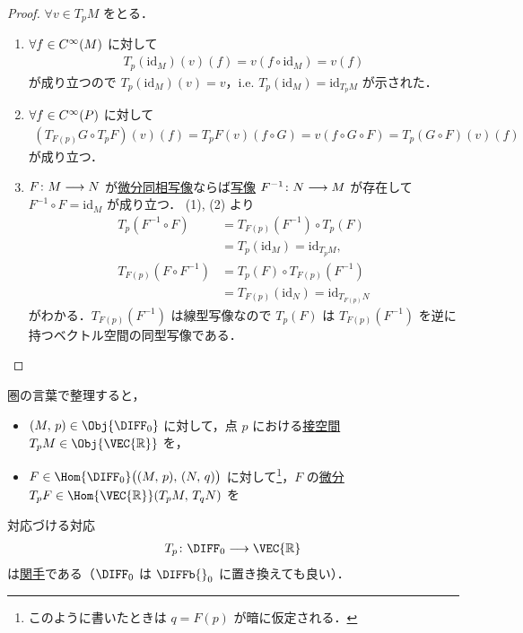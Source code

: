 \documentclass[geometry_main]{subfiles}
\begin{document}
\begin{proof}
	$\forall v \in T_p M$ をとる．
	\begin{enumerate}
		\item $\forall f \in C^\infty(M)$ に対して
		\begin{align}
			T_p (\mathrm{id}_M) (v)(f) = v (f \circ \mathrm{id}_M) = v(f)
		\end{align}
		が成り立つので $T_p (\mathrm{id}_M)(v) = v$，i.e. $T_p (\mathrm{id}_M) = \mathrm{id}_{T_p M}$ が示された．
		\item $\forall f \in C^\infty(P)$ に対して
		\begin{align}
			(T_{F(p)} G \circ T_p F)(v)(f) = T_p F(v)(f \circ G) = v (f \circ G \circ F) = T_p (G \circ F)(v)(f)
		\end{align}
		が成り立つ．
		\item $F \colon M \longrightarrow N$ が\hyperref[def.diff]{微分同相写像}ならば\hyperref[def.cinfty_mapping]{\cinfty 写像} $F^{-1} \colon N \longrightarrow M$ が存在して
		$F^{-1} \circ F = \mathrm{id}_M$ が成り立つ．
		(1), (2) より
		\begin{align}
			T_p (F^{-1} \circ F) &= T_{F(p)} (F^{-1}) \circ T_{p} (F) \\
			&= T_p(\mathrm{id}_M) = \mathrm{id}_{T_p M}, \\
			T_{F(p)} (F\circ F^{-1}) &= T_{p} (F) \circ T_{F(p)} (F^{-1}) \\
			&= T_{F(p)}(\mathrm{id}_N) = \mathrm{id}_{T_{F(p)} N} 
		\end{align}
		がわかる．$T_{F(p)} (F^{-1})$ は線型写像なので $T_{p} (F)$ は $T_{F(p)} (F^{-1})$ を逆に持つベクトル空間の同型写像である．
	\end{enumerate}
\end{proof}

圏の言葉で整理すると，
\begin{itemize}
	\item $(M,\, p) \in \Obj{\DIFF_0}$ に対して，点 $p$ における\hyperref[def.tangentv]{接空間} $T_p M \in \Obj{\VEC{\mathbb{R}}}$ を，
	\item $F \in \Hom{\DIFF_0} \bigl( (M,\, p),\, (N,\, q) \bigr)$ に対して\footnote{このように書いたときは $q = F(p)$ が暗に仮定される．}，$F$ の\hyperref[def:functor-Tp]{微分} $T_p F \in \Hom{\VEC{\mathbb{R}}}(T_p M,\, T_{q} N)$ を
\end{itemize}
対応づける対応
\begin{align}
	T_p \colon \DIFF_0 \lto \VEC{\mathbb{R}}
\end{align}
は\hyperref[def:functor]{関手}である（$\DIFF_0$ は $\DIFFb{}_0$ に置き換えても良い）．
\end{document}
